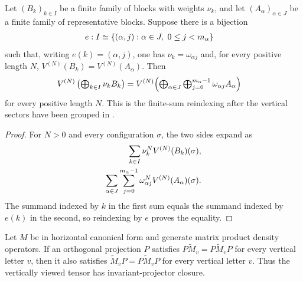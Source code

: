 \begin{lemma}
    \label{lem:vertical_grouping_equiv}
    \leanok
    Let $(B_k)_{k\in I}$ be a finite family of blocks with weights $\nu_k$,
    and let $(A_\alpha)_{\alpha\in J}$ be a finite family of representative
    blocks. Suppose there is a bijection
    \begin{align}
        e:I&\simeq\{(\alpha,j):\alpha\in J,\ 0\leq j<m_\alpha\}
        \notag
    \end{align}
    such that, writing $e(k)=(\alpha,j)$, one has
    $\nu_k=\omega_{\alpha j}$ and, for every positive length $N$,
    $V^{(N)}(B_k)=V^{(N)}(A_\alpha)$. Then
    \begin{align}
        V^{(N)}\left(\textstyle\bigoplus_{k\in I}\nu_kB_k\right)
        &=
        V^{(N)}\Bigl(      \textstyle\bigoplus_{\alpha\in J}
          \bigoplus_{j=0}^{m_\alpha-1}\omega_{\alpha j}A_\alpha
        \Bigr)
        \notag
    \end{align}
    for every positive length $N$. This is the finite-sum
    reindexing after the vertical sectors have been grouped in
    \cite[Proposition~4.13]{Cirac2016MPDO_arXiv}.
\end{lemma}
\begin{proof}\leanok
    For $N>0$ and every configuration $\sigma$, the two sides expand as
    \begin{align}
        \sum_{k\in I}\nu_k^NV^{(N)}(B_k)(\sigma),
        \notag\\
        \sum_{\alpha\in J}\sum_{j=0}^{m_\alpha-1}
        \omega_{\alpha j}^NV^{(N)}(A_\alpha)(\sigma).
        \notag
    \end{align}
    The summand indexed by $k$ in the first sum equals the summand indexed by
    $e(k)$ in the second, so reindexing by $e$ proves the equality.
\end{proof}

\begin{theorem}
    \label{thm:mpdo_vertical_projector_closure}
    \leanok
    Let $M$ be in horizontal canonical form and generate matrix product
    density operators. If an orthogonal projection $P$ satisfies
    $P\widetilde M_v=P\widetilde M_vP$ for every vertical letter $v$, then it
    also satisfies $\widetilde M_vP=P\widetilde M_vP$ for every vertical
    letter $v$. Thus the vertically viewed tensor has invariant-projector
    closure.
\end{theorem}

